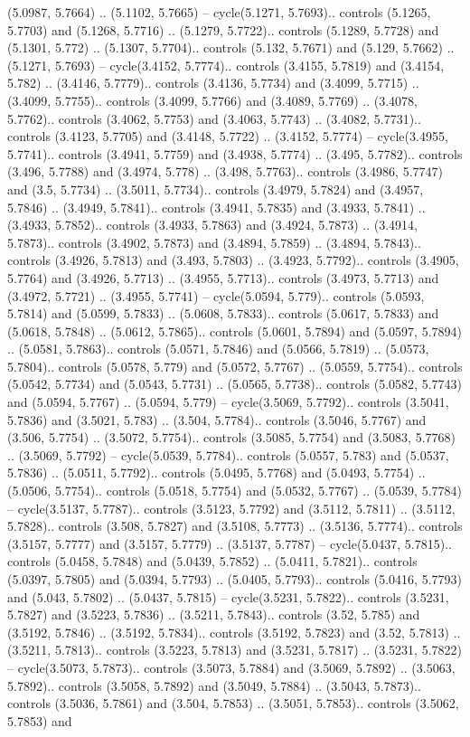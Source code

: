 (5.0987, 5.7664) .. (5.1102, 5.7665) -- cycle(5.1271, 5.7693).. controls (5.1265, 5.7703) and (5.1268, 5.7716) .. (5.1279, 5.7722).. controls (5.1289, 5.7728) and (5.1301, 5.772) .. (5.1307, 5.7704).. controls (5.132, 5.7671) and (5.129, 5.7662) .. (5.1271, 5.7693) -- cycle(3.4152, 5.7774).. controls (3.4155, 5.7819) and (3.4154, 5.782) .. (3.4146, 5.7779).. controls (3.4136, 5.7734) and (3.4099, 5.7715) .. (3.4099, 5.7755).. controls (3.4099, 5.7766) and (3.4089, 5.7769) .. (3.4078, 5.7762).. controls (3.4062, 5.7753) and (3.4063, 5.7743) .. (3.4082, 5.7731).. controls (3.4123, 5.7705) and (3.4148, 5.7722) .. (3.4152, 5.7774) -- cycle(3.4955, 5.7741).. controls (3.4941, 5.7759) and (3.4938, 5.7774) .. (3.495, 5.7782).. controls (3.496, 5.7788) and (3.4974, 5.778) .. (3.498, 5.7763).. controls (3.4986, 5.7747) and (3.5, 5.7734) .. (3.5011, 5.7734).. controls (3.4979, 5.7824) and (3.4957, 5.7846) .. (3.4949, 5.7841).. controls (3.4941, 5.7835) and (3.4933, 5.7841) .. (3.4933, 5.7852).. controls (3.4933, 5.7863) and (3.4924, 5.7873) .. (3.4914, 5.7873).. controls (3.4902, 5.7873) and (3.4894, 5.7859) .. (3.4894, 5.7843).. controls (3.4926, 5.7813) and (3.493, 5.7803) .. (3.4923, 5.7792).. controls (3.4905, 5.7764) and (3.4926, 5.7713) .. (3.4955, 5.7713).. controls (3.4973, 5.7713) and (3.4972, 5.7721) .. (3.4955, 5.7741) -- cycle(5.0594, 5.779).. controls (5.0593, 5.7814) and (5.0599, 5.7833) .. (5.0608, 5.7833).. controls (5.0617, 5.7833) and (5.0618, 5.7848) .. (5.0612, 5.7865).. controls (5.0601, 5.7894) and (5.0597, 5.7894) .. (5.0581, 5.7863).. controls (5.0571, 5.7846) and (5.0566, 5.7819) .. (5.0573, 5.7804).. controls (5.0578, 5.779) and (5.0572, 5.7767) .. (5.0559, 5.7754).. controls (5.0542, 5.7734) and (5.0543, 5.7731) .. (5.0565, 5.7738).. controls (5.0582, 5.7743) and (5.0594, 5.7767) .. (5.0594, 5.779) -- cycle(3.5069, 5.7792).. controls (3.5041, 5.7836) and (3.5021, 5.783) .. (3.504, 5.7784).. controls (3.5046, 5.7767) and (3.506, 5.7754) .. (3.5072, 5.7754).. controls (3.5085, 5.7754) and (3.5083, 5.7768) .. (3.5069, 5.7792) -- cycle(5.0539, 5.7784).. controls (5.0557, 5.783) and (5.0537, 5.7836) .. (5.0511, 5.7792).. controls (5.0495, 5.7768) and (5.0493, 5.7754) .. (5.0506, 5.7754).. controls (5.0518, 5.7754) and (5.0532, 5.7767) .. (5.0539, 5.7784) -- cycle(3.5137, 5.7787).. controls (3.5123, 5.7792) and (3.5112, 5.7811) .. (3.5112, 5.7828).. controls (3.508, 5.7827) and (3.5108, 5.7773) .. (3.5136, 5.7774).. controls (3.5157, 5.7777) and (3.5157, 5.7779) .. (3.5137, 5.7787) -- cycle(5.0437, 5.7815).. controls (5.0458, 5.7848) and (5.0439, 5.7852) .. (5.0411, 5.7821).. controls (5.0397, 5.7805) and (5.0394, 5.7793) .. (5.0405, 5.7793).. controls (5.0416, 5.7793) and (5.043, 5.7802) .. (5.0437, 5.7815) -- cycle(3.5231, 5.7822).. controls (3.5231, 5.7827) and (3.5223, 5.7836) .. (3.5211, 5.7843).. controls (3.52, 5.785) and (3.5192, 5.7846) .. (3.5192, 5.7834).. controls (3.5192, 5.7823) and (3.52, 5.7813) .. (3.5211, 5.7813).. controls (3.5223, 5.7813) and (3.5231, 5.7817) .. (3.5231, 5.7822) -- cycle(3.5073, 5.7873).. controls (3.5073, 5.7884) and (3.5069, 5.7892) .. (3.5063, 5.7892).. controls (3.5058, 5.7892) and (3.5049, 5.7884) .. (3.5043, 5.7873).. controls (3.5036, 5.7861) and (3.504, 5.7853) .. (3.5051, 5.7853).. controls (3.5062, 5.7853) and 